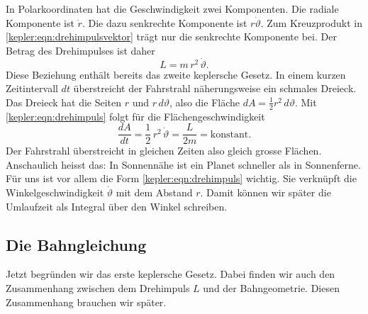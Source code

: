 In Polarkoordinaten hat die Geschwindigkeit zwei Komponenten.
Die radiale Komponente ist $\dot{r}$.
Die dazu senkrechte Komponente ist $r\dot{\vartheta}$.
Zum Kreuzprodukt in \eqref{kepler:eqn:drehimpulsvektor} trägt nur die senkrechte Komponente bei.
Der Betrag des Drehimpulses ist daher
\begin{equation}
L
=
m\,r^2\,\dot{\vartheta}.
\label{kepler:eqn:drehimpuls}
\end{equation}
Diese Beziehung enthält bereits das zweite keplersche Gesetz.
%
In einem kurzen Zeitintervall $dt$ überstreicht der Fahrstrahl näherungsweise ein schmales Dreieck.
%
Das Dreieck hat die Seiten $r$ und $r\,d\vartheta$, also die Fläche $dA=\frac12 r^2\,d\vartheta$.
Mit \eqref{kepler:eqn:drehimpuls} folgt für die
Flächengeschwindigkeit
\begin{equation}
\frac{dA}{dt}
=
\frac12\,r^2\,\dot{\vartheta}
=
\frac{L}{2m}
=
\text{konstant}.
\label{kepler:eqn:flaechensatz}
\end{equation}
Der Fahrstrahl überstreicht in gleichen Zeiten also gleich grosse Flächen.
Anschaulich heisst das: In Sonnennähe ist ein Planet schneller als in Sonnenferne.
Für uns ist vor allem die Form \eqref{kepler:eqn:drehimpuls} wichtig.
Sie verknüpft die Winkelgeschwindigkeit $\dot{\vartheta}$ mit dem Abstand $r$.
Damit können wir später die Umlaufzeit als Integral über den Winkel schreiben.

\subsection{Die Bahngleichung
\label{kepler:subsection:bahngleichung}}

Jetzt begründen wir das erste keplersche Gesetz.
Dabei finden wir auch den Zusammenhang zwischen dem Drehimpuls $L$ und der Bahngeometrie.
Diesen Zusammenhang brauchen wir später.

